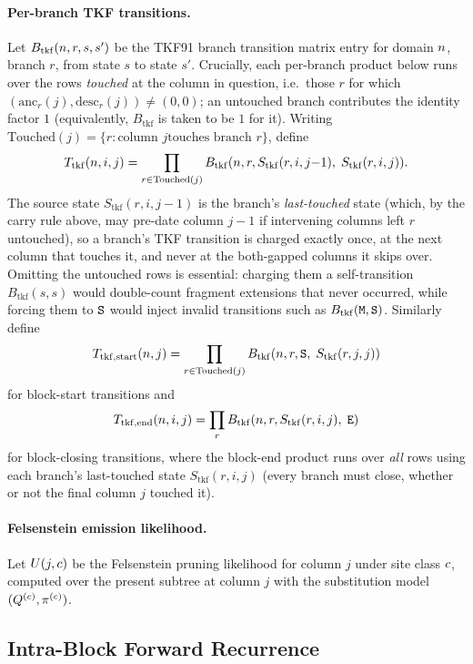 \paragraph{Per-branch TKF transitions.}
Let $B_{\mathrm{tkf}}(n, r, s, s')$ be the TKF91 branch transition
matrix entry for domain $n$, branch $r$, from state $s$ to state $s'$.
Crucially, each per-branch product below runs over the rows
\emph{touched} at the column in question, i.e.\ those $r$ for which
$(\text{anc}_r(j),\text{desc}_r(j)) \neq (0,0)$; an untouched branch
contributes the identity factor $1$ (equivalently, $B_{\mathrm{tkf}}$ is
taken to be $1$ for it). Writing $\mathrm{Touched}(j) = \{r : \text{column $j$
touches branch } r\}$, define
\[
T_{\mathrm{tkf}}(n, i, j) = \prod_{r \in \mathrm{Touched}(j)} B_{\mathrm{tkf}}(n, r, S_{\mathrm{tkf}}(r, i, j{-}1),\; S_{\mathrm{tkf}}(r, i, j)).
\]
The source state $S_{\mathrm{tkf}}(r, i, j{-}1)$ is the branch's
\emph{last-touched} state (which, by the carry rule above, may pre-date
column $j{-}1$ if intervening columns left $r$ untouched), so a branch's
TKF transition is charged exactly once, at the next column that touches
it, and never at the both-gapped columns it skips over. Omitting the
untouched rows is essential: charging them a self-transition
$B_{\mathrm{tkf}}(s,s)$ would double-count fragment extensions that never
occurred, while forcing them to ${\tt S}$ would inject invalid transitions
such as $B_{\mathrm{tkf}}({\tt M},{\tt S})$. Similarly define
\[
T_{\mathrm{tkf,start}}(n, j) = \prod_{r \in \mathrm{Touched}(j)} B_{\mathrm{tkf}}(n, r, {\tt S},\; S_{\mathrm{tkf}}(r, j, j))
\]
for block-start transitions and
\[
T_{\mathrm{tkf,end}}(n, i, j) = \prod_r B_{\mathrm{tkf}}(n, r, S_{\mathrm{tkf}}(r, i, j),\; {\tt E})
\]
for block-closing transitions, where the block-end product runs over
\emph{all} rows using each branch's last-touched state
$S_{\mathrm{tkf}}(r, i, j)$ (every branch must close, whether or not the
final column $j$ touched it).

\paragraph{Felsenstein emission likelihood.}
Let $U(j, c)$ be the Felsenstein pruning likelihood for column $j$
under site class $c$, computed over the present subtree at column $j$
with the substitution model $(Q^{(c)}, \pi^{(c)})$.

\subsection{Intra-Block Forward Recurrence}
\label{sec:intra-block-forward}

